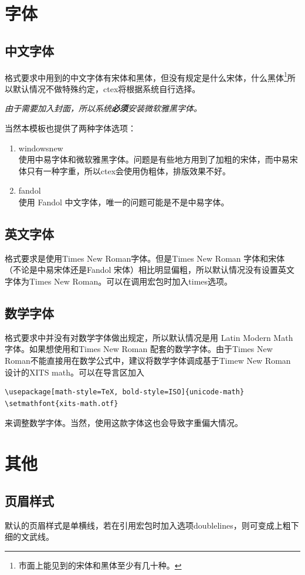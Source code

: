 \documentclass{LZU}
\newenvironment{note}{\par\itshape\noindent{\makebox[-5pt][r]{\scriptsize\color{red!90}\textdbend\quad}}}{\par}
\newcommand{\package}[1]{{\sffamily #1}}
\begin{document}
\section{字体}
\subsection{中文字体}
格式要求中用到的中文字体有宋体和黑体，但没有规定是什么宋体，什么黑体\footnote{市面上能见到的宋体和黑体至少有几十种。}所以默认情况不做特殊约定，\package{ctex}将根据系统自行选择。
\begin{note}
    由于需要加入封面，所以系统{\bf 必须}安装微软雅黑字体。
\end{note}

当然本模板也提供了两种字体选项：
\begin{enumerate}
    \item windowsnew\\
        使用中易字体和微软雅黑字体。问题是有些地方用到了加粗的宋体，而中易宋体只有一种字重，所以\package{ctex}会使用伪粗体，排版效果不好。
    \item fandol\\
        使用 Fandol 中文字体，唯一的问题可能是不是中易字体。
\end{enumerate}
\subsection{英文字体}
格式要求是使用Times New Roman字体。但是Times New Roman 字体和宋体（不论是中易宋体还是Fandol 宋体）相比明显偏粗，所以默认情况没有设置英文字体为Times New Roman。可以在调用宏包时加入times选项。
\subsection{数学字体}
\label{subsec:math_font}
格式要求中并没有对数学字体做出规定，所以默认情况是用 Latin Modern Math 字体。如果想使用和Times New Roman 配套的数学字体。由于Times New Roman不能直接用在数学公式中，建议将数学字体调成基于Timew New Roman 设计的XITS math。可以在导言区加入
\begin{verbatim}
\usepackage[math-style=TeX, bold-style=ISO]{unicode-math}
\setmathfont{xits-math.otf}
\end{verbatim}
来调整数学字体。当然，使用这款字体这也会导致字重偏大情况。

\section{其他}
\subsection{页眉样式}
默认的页眉样式是单横线，若在引用宏包时加入选项doublelines，则可变成上粗下细的文武线。
\end{document}
